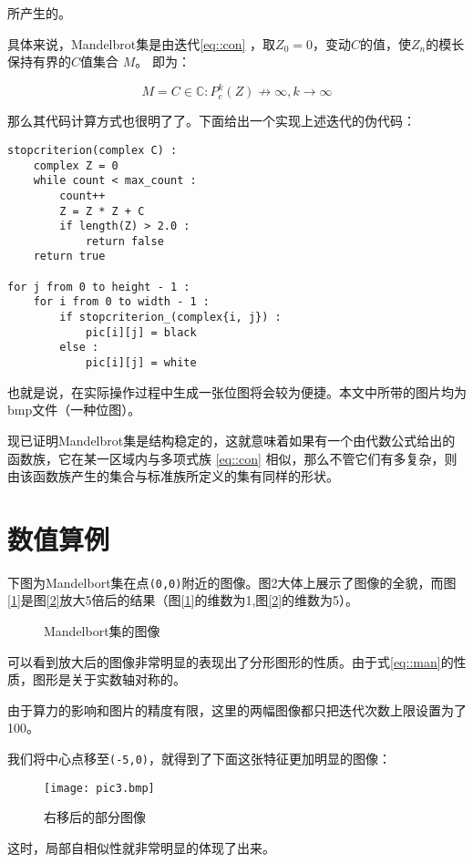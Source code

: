 \documentclass[UTF8]{article}
\begin{document}
所产生的。

具体来说，Mandelbrot集是由迭代\ref{eq::con} ，取$Z_0 = 0$，变动$C$的值，使${Z_n}$的模长保持有界的$C$值集合 $M$。\cite{CT_Mand1} 即为：

\begin{equation}
  M = {C \in \mathbb{C} : P_c^k(Z) \nrightarrow \infty, k \to \infty}
  \label{eq::man}
\end{equation}

那么其代码计算方式也很明了了。下面给出一个实现上述迭代的伪代码：

\begin{verbatim}
stopcriterion(complex C) :
    complex Z = 0
    while count < max_count :
        count++
        Z = Z * Z + C
        if length(Z) > 2.0 :
            return false
    return true

for j from 0 to height - 1 :  
    for i from 0 to width - 1 :
        if stopcriterion_(complex{i, j}) :
            pic[i][j] = black
        else :
            pic[i][j] = white

\end{verbatim}

也就是说，在实际操作过程中生成一张位图将会较为便捷。本文中所带的图片均为bmp文件（一种位图）。

现已证明Mandelbrot集是结构稳定的，这就意味着如果有一个由代数公式给出的函数族，它在某一区域内与多项式族 \ref{eq::con} 相似，那么不管它们有多复杂，则由该函数族产生的集合与标准族所定义的集有同样的形状。

\section{数值算例}

下图为Mandelbort集在点\verb|(0,0)|附近的图像。图2大体上展示了图像的全貌，而图\ref{1}是图\ref{2}放大5倍后的结果（图\ref{1}的维数为1,图\ref{2}的维数为5）。

\begin{figure}[htbp]
\centering
{}
\quad
{}
\caption{Mandelbort集的图像}
\end{figure}

可以看到放大后的图像非常明显的表现出了分形图形的性质。由于式\ref{eq::man}的性质，图形是关于实数轴对称的。

由于算力的影响和图片的精度有限，这里的两幅图像都只把迭代次数上限设置为了100。

我们将中心点移至\verb|(-5,0)|，就得到了下面这张特征更加明显的图像：

\begin{figure}[htbp]
\centering
\texttt{[image: pic3.bmp]} \label{3}
\caption{右移后的部分图像}
\end{figure}

这时，局部自相似性就非常明显的体现了出来。


\end{document}
